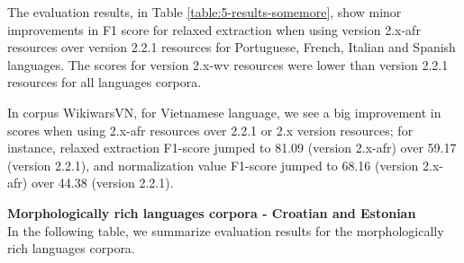 The evaluation results, in Table \ref{table:5-results-somemore}, show minor improvements in F1 score for relaxed extraction when using version 2.x-afr resources over version 2.2.1 resources for Portuguese, French, Italian and Spanish languages. The scores for version 2.x-wv resources were lower than version 2.2.1 resources for all languages corpora. 

In corpus WikiwarsVN, for Vietnamese language, we see a big improvement in scores when using 2.x-afr resources over 2.2.1 or 2.x version resources; for instance, relaxed extraction F1-score jumped to 81.09 (version 2.x-afr) over 59.17 (version 2.2.1), and normalization value F1-score jumped to 68.16 (version 2.x-afr) over 44.38 (version 2.2.1). 


\textbf{Morphologically rich languages corpora - Croatian and Estonian}\\
In the following table, we summarize evaluation results for the morphologically rich languages corpora.
